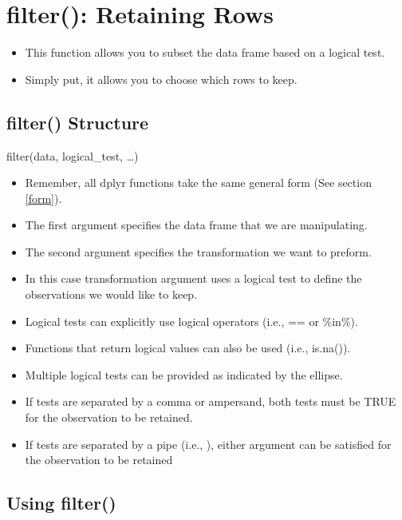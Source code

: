 \documentclass[]{book}
\providecommand{\tightlist}{%
  \setlength{\itemsep}{0pt}\setlength{\parskip}{0pt}}
\theoremstyle{definition}
\theoremstyle{definition}
\theoremstyle{definition}
\theoremstyle{remark}
\begin{document}
\hypertarget{filter}{%
\section{filter(): Retaining Rows}\label{filter}}

\begin{itemize}
\tightlist
\item
  This function allows you to subset the data frame based on a logical test.
\item
  Simply put, it allows you to choose which rows to keep.
\end{itemize}

\hypertarget{filter-structure}{%
\subsection{filter() Structure}\label{filter-structure}}

filter(data, logical\_test, \ldots{})

\begin{itemize}
\tightlist
\item
  Remember, all dplyr functions take the same general form (See section \ref{form}).
\item
  The first argument specifies the data frame that we are manipulating.
\item
  The second argument specifies the transformation we want to preform.
\item
  In this case transformation argument uses a logical test to define the observations we would like to keep.
\item
  Logical tests can explicitly use logical operators (i.e., == or \%in\%).
\item
  Functions that return logical values can also be used (i.e., is.na()).
\item
  Multiple logical tests can be provided as indicated by the ellipse.
\item
  If tests are separated by a comma or ampersand, both tests must be TRUE for the observation to be retained.
\item
  If tests are separated by a pipe (i.e., \textbar{}), either argument can be satisfied for the observation to be retained
\end{itemize}

\hypertarget{using-filter}{%
\subsection{Using filter()}\label{using-filter}}
\end{document}
